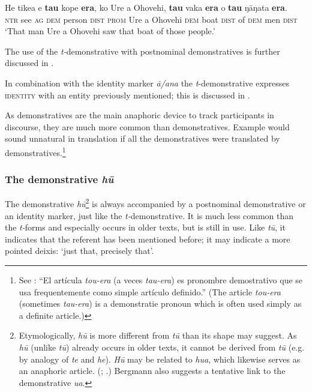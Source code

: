 \ea\label{ex:4.192}
\gll He tike{\ꞌ}a e \textbf{tau} kope \textbf{era}, ko Ure {\ꞌ}a Ohovehi, \textbf{tau} vaka \textbf{era}  o \textbf{tau} ŋāŋata \textbf{era}.\\
\textsc{ntr} see \textsc{ag} \textsc{dem} person \textsc{dist} \textsc{prom} Ure a Ohovehi \textsc{dem} boat \textsc{dist}  of \textsc{dem} men \textsc{dist}\\

\glt
‘That man Ure a Ohovehi saw that boat of those people.’ \textstyleExampleref{[Blx-3.070]}
\z

The use of the \textit{t-}demonstrative with postnominal demonstratives is further discussed in .

In combination with the identity marker \textit{{\ꞌ}ā}\textit{/{\ꞌ}ana} the \textit{t}{}-demonstrative expresses \textsc{identity} with an entity previously mentioned; this is discussed in .

As demonstratives are the main anaphoric device to track participants in discourse, they are much more common than  demonstratives. Example  would sound unnatural in translation if all the demonstratives were translated by demonstratives.\footnote{\label{fn:214}See \citet[21]{Englert1978}: “El artícula \textit{tou-era} (a veces \textit{tau-era}) es pronombre demostrativo que se usa frequentemente como simple artículo definido.” (The article \textit{tou-era} (sometimes \textit{tau-era}) is a demonstratie pronoun which is often used simply as a definite article.)} 

\subsubsection{The demonstrative \textit{hū}}\label{sec:4.6.2.2}
The demonstrative \textit{hū}\footnote{\label{fn:215}Etymologically, \textit{hū} is more different from \textit{tū} than its shape may suggest. As \textit{hū} (unlike \textit{tū}) already occurs in older texts, it cannot be derived from \textit{tū} (e.g. by analogy of \textit{te} and \textit{he}). \textit{Hū} may be related to  \textit{hua}, which likewise serves as an anaphoric article. (\citealt[62]{Cablitz2006}; \citealt[49]{Bergmann1963}.) Bergmann also suggests a tentative link to the  demonstrative \textit{ua}.} is always accompanied by a postnominal demonstrative or an identity marker, just like the \textit{t-}demonstrative. It is much less common than the \textit{t-}forms and especially occurs in older texts, but is still in use. Like \textit{tū}, it indicates that the referent has been mentioned before; it may indicate a more pointed deixis: ‘just that, precisely that’.

